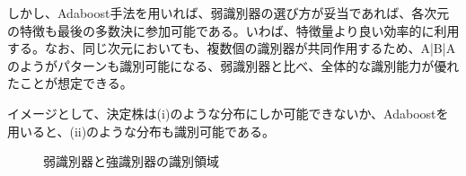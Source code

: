 \documentclass[ %
  uplatex,%
  papersize%
]{jsarticle}
\begin{document}
しかし、Adaboost手法を用いれば、弱識別器の選び方が妥当であれば、各次元の特徴も最後の多数決に参加可能である。いわば、特徴量より良い効率的に利用する。なお、同じ次元においても、複数個の識別器が共同作用するため、A|B|Aのようがパターンも識別可能になる、弱識別器と比べ、全体的な識別能力が優れたことが想定できる。

イメージとして、決定株は(i)のような分布にしか可能できないか、Adaboostを用いると、(ii)のような分布も識別可能である。

\newpage

\begin{figure}[!h]
\centering
{}
\caption{弱識別器と強識別器の識別領域} 
\end{figure}
\end{document}
